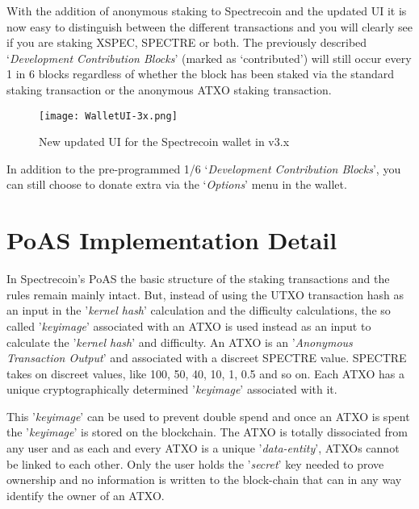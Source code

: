 With the addition of anonymous staking to Spectrecoin and the updated UI it 
is now easy to distinguish between the different transactions and you will 
clearly see if you are staking XSPEC, SPECTRE or both. The previously 
described ‘\textit{Development Contribution Blocks}’ (marked as ‘contributed’) 
will still occur every 1 in 6 blocks regardless of whether the block has 
been staked via the standard staking transaction or the anonymous ATXO 
staking transaction.



\begin{figure}[h]
	\caption{New updated UI for the Spectrecoin wallet in v3.x}
	\centering
	\texttt{[image: WalletUI-3x.png]}
\end{figure}



In addition to the pre-programmed 1/6 ‘\textit{Development Contribution Blocks}’, 
you can still choose to donate extra via the ‘\textit{Options}’ menu in the wallet.



\section{PoAS Implementation Detail} 
In Spectrecoin's PoAS the basic structure of the staking transactions and 
the rules remain mainly intact. But, instead of using the UTXO transaction 
hash as an input in the '\textit{kernel hash}' calculation and the 
difficulty calculations, the so called '\textit{keyimage}' associated with 
an ATXO is used instead as an input to calculate the '\textit{kernel hash}' 
and difficulty. An ATXO is an '\textit{Anonymous Transaction Output}' and 
associated with a discreet SPECTRE value. SPECTRE takes on discreet values, 
like 100, 50, 40, 10, 1, 0.5 and so on. Each ATXO has a unique 
cryptographically determined '\textit{keyimage}' associated with it. 



This '\textit{keyimage}' can be used to prevent double spend and once an 
ATXO is spent the '\textit{keyimage}' is stored on the blockchain. The ATXO 
is totally dissociated from any user and as each and every ATXO is a unique 
'\textit{data-entity}', ATXOs cannot be linked to each other. Only the user 
holds the '\textit{secret}' key needed to prove ownership and no information 
is written to the block-chain that can in any way identify the owner of an 
ATXO. 



